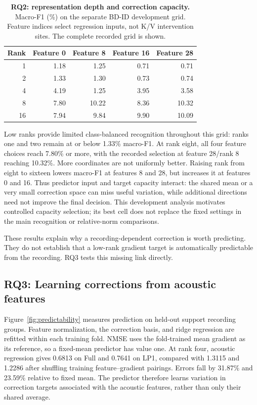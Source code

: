 \documentclass{article}
\begin{document}
\begin{table}[t]
\caption{\textbf{RQ2: representation depth and correction capacity.} Macro-F1 (\%) on the separate BD-ID development grid. Feature indices select regression inputs, not K/V intervention sites. The complete recorded grid is shown.}
\label{tab:rankdepth}
\centering\small
\begin{tabular}{@{}rrrrr@{}}
\toprule
Rank & Feature 0 & Feature 8 & Feature 16 & Feature 28 \\
\midrule
1 & 1.18 & 1.25 & 0.71 & 0.71 \\
2 & 1.33 & 1.30 & 0.73 & 0.74 \\
4 & 4.19 & 1.25 & 3.95 & 3.58 \\
8 & 7.80 & 10.22 & 8.36 & 10.32 \\
16 & 7.94 & 9.84 & 9.90 & 10.09 \\
\bottomrule
\end{tabular}
\end{table}

Low ranks provide limited class-balanced recognition throughout this grid: ranks one and two remain at or below 1.33\% macro-F1. At rank eight, all four feature choices reach 7.80\% or more, with the recorded selection at feature 28/rank 8 reaching 10.32\%. More coordinates are not uniformly better. Raising rank from eight to sixteen lowers macro-F1 at features 8 and 28, but increases it at features 0 and 16. Thus predictor input and target capacity interact: the shared mean or a very small correction space can miss useful variation, while additional directions need not improve the final decision. This development analysis motivates controlled capacity selection; its best cell does not replace the fixed settings in the main recognition or relative-norm comparisons.

These results explain why a recording-dependent correction is worth predicting. They do not establish that a low-rank gradient target is automatically predictable from the recording. RQ3 tests this missing link directly.

\subsection{RQ3: Learning corrections from acoustic features}
\label{sec:rq3}
Figure~\ref{fig:predictability} measures prediction on held-out support recording groups. Feature normalization, the correction basis, and ridge regression are refitted within each training fold. NMSE uses the fold-trained mean gradient as its reference, so a fixed-mean predictor has value one. At rank four, acoustic regression gives 0.6813 on Full and 0.7641 on LP1, compared with 1.3115 and 1.2286 after shuffling training feature--gradient pairings. Errors fall by 31.87\% and 23.59\% relative to fixed mean. The predictor therefore learns variation in correction targets associated with the acoustic features, rather than only their shared average.
\end{document}
